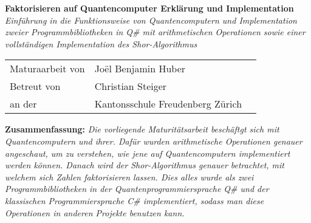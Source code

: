 \begin{titlepage}
    \centering
    {\huge \textbf{Faktorisieren auf Quantencomputer \newline Erklärung und Implementation}}
    \vspace{1cm}
    \newline
    {\LARGE\textit{Einführung in die Funktionsweise von Quantencomputern und Implementation zweier Programmbibliotheken in Q\# mit arithmetischen Operationen sowie einer vollständigen Implementation des Shor-Algorithmus}}
    \vspace{1cm}
    \newline
    {\Large \begin{tabular}{l@{}ll}
        Maturaarbeit von \; \; &  Joël Benjamin Huber & \\
        Betreut von & Christian Steiger & \\
        an der & Kantonsschule Freudenberg Zürich & \\
    \end{tabular}
    }
    \vspace{3cm}
    \newline
    {

        \textbf{Zusammenfassung: } \textit{Die vorliegende Maturitätsarbeit beschäftgt sich mit Quantencomputern und ihrer. Dafür wurden arithmetische Operationen genauer angeschaut, um zu verstehen, wie jene auf Quantencomputern implementiert werden können. Danach wird der Shor-Algorithmus genauer betrachtet, mit welchem sich Zahlen faktorisieren lassen. Dies alles wurde als zwei Programmbibliotheken in der Quantenprogrammiersprache Q\# und der klassischen Programmiersprache C\# implementiert, sodass man diese Operationen in anderen Projekte benutzen kann. }
    }
\end{titlepage}